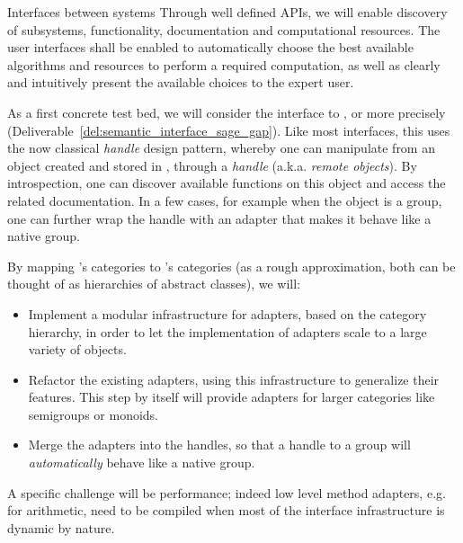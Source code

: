 \begin{Workpackage}{\thewpno}
\begin{task}{Interfaces between systems}
    Through well defined APIs, we will enable discovery of subsystems,
    functionality, documentation and computational resources. The user
    interfaces shall be enabled to automatically choose the best
    available algorithms and resources to perform a required
    computation, as well as clearly and intuitively present the
    available choices to the expert user.

    As a first concrete test bed, we will consider the \Sage interface
    to \GAP, or more precisely \libGAP
    (Deliverable~\ref{del:semantic_interface_sage_gap}). Like most
    \Sage interfaces, this uses the now classical \emph{handle} design
    pattern, whereby one can manipulate from \Sage an object created
    and stored in \GAP, through a \emph{handle} (a.k.a. \emph{remote
      objects}). By introspection, one can discover available \GAP
    functions on this object and access the related \GAP
    documentation. In a few cases, for example when the object is a
    group, one can further wrap the handle with an adapter that makes
    it behave like a native \Sage group.

    By mapping \GAP's categories to \Sage's categories (as a rough
    approximation, both can be thought of as hierarchies of abstract
    classes), we will:
    \begin{itemize}
    \item Implement a modular infrastructure for adapters, based on
      the category hierarchy, in order to let the implementation of
      adapters scale to a large variety of objects.
    \item Refactor the existing adapters, using this infrastructure to
      generalize their features. This step by itself will provide
      adapters for larger categories like semigroups or monoids.
    \item Merge the adapters into the handles, so that a handle to a
      \GAP group will \emph{automatically} behave like a native \Sage
      group.
    \end{itemize}
    A specific challenge will be performance; indeed low level method
    adapters, e.g. for arithmetic, need to be compiled when most of
    the interface infrastructure is dynamic by nature.



\end{task}
\end{Workpackage}

